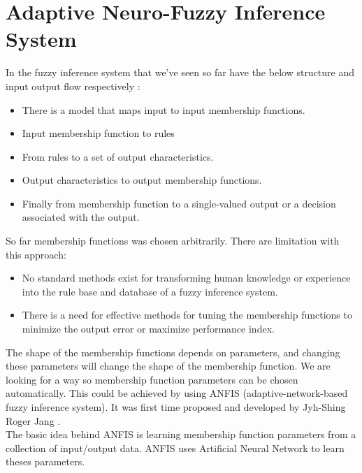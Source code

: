 \documentclass{article}
\begin{document}
\section{Adaptive Neuro-Fuzzy Inference System }\label{Adaptive_Neuro-Fuzzy_Inference_System}

In the fuzzy inference system that we've seen so far have the below structure and input output flow respectively : 
\begin{itemize}
\item There is a model that maps input to input membership functions.
\item Input membership function to rules
\item From rules to a set of output characteristics.
\item Output characteristics to output membership functions.
\item Finally from membership function to a single-valued output or a decision associated with the output.
\end{itemize}

So far membership functions was chosen arbitrarily. There are limitation with this approach:
\begin{itemize}
\item No standard methods exist for transforming human knowledge or experience into the rule base and database of a fuzzy inference system.
\item There is a need for effective methods for tuning the membership functions to minimize the
output error or maximize performance index.
\end{itemize}
The shape of the membership functions depends on parameters, and changing these parameters will change the shape of the membership function. We are looking for a way so membership function parameters can be chosen automatically. This could be achieved  by using ANFIS (adaptive-network-based fuzzy inference system). 
It was first time proposed and developed by Jyh-Shing Roger Jang \cite{ANFIS_adaptive-network-based_fuzzy_inference_system}.
\\
The basic idea behind ANFIS is learning membership function parameters from a collection of input/output data.
ANFIS uses Artificial Neural Network to learn theses parameters.
%
\end{document}
